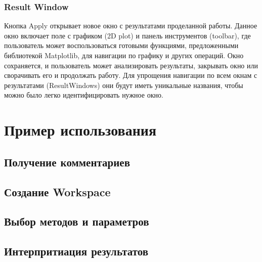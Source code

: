 		\subsubsection{Result Window}		
			Кнопка Apply открывает новое окно с результатами проделанной работы. Данное окно включает поле с графиком (2D plot) и панель инструментов (toolbar), где пользователь может воспользоваться готовыми функциями, предложенными библиотекой Matplotlib, для навигации по графику и других операций. Окно сохраняется, и пользователь может анализировать результаты, закрывать окно или сворачивать его и продолжать работу. Для упрощения навигации по всем окнам с результатами (ResultWindows) они будут иметь уникальные названия, чтобы можно было легко идентифицировать нужное окно.
			

\section{Пример использования}
		
	\subsection{Получение комментариев}	
	\subsection{Создание Workspace}
	\subsection{Выбор методов и параметров}
	\subsection{Интерпритиация результатов}

